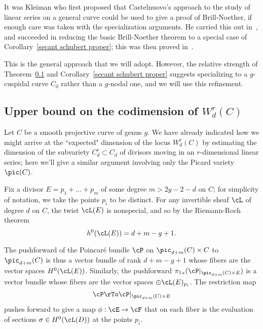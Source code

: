 
It was Kleiman who first proposed that Castelnuovo's approach to the study of linear series on a general curve could be used to give a proof of Brill-Noether, if enough care was taken with the specialization arguments. He carried this out in~\cite{Kleiman-special}, and succeeded in reducing the basic Brill-Noether theorem to a special case of Corollary~\ref{secant schubert proper}; this was then proved in~\cite{Griffiths-Harris-BN}.

This is the general approach that we will adopt. However, the relative strength of Theorem~\ref{} and Corollary~\ref{secant schubert proper} suggests specializing to a $g$-cuspidal curve $C_0$ rather than a $g$-nodal one, and we will use
this refinement.

\subsection{Upper bound on the codimension of $W^r_d(C)$}

Let $C$ be a smooth projective curve of genus $g$. We have already indicated how we might arrive at the ``expected" dimension of the locus $W^r_d(C)$ by estimating the dimension of the subvariety $C^r_d \subset C_d$ of divisors moving in an $r$-dimensional linear series; here we'll give a similar argument involving only the Picard variety $\pic(C)$.

Fix a divisor $E = p_1 + \dots + p_m$ of some degree $m > 2g-2-d$ on $C$; for simplicity of notation, we take the points $p_i$ to be distinct. For any invertible sheaf $\cL$ of degree $d$ on $C$, the twist $\cL(E)$ is nonspecial, and so by the Riemann-Roch theorem 
$$
h^0(\cL(E)) = d + m - g + 1.
$$

The pushforward of the Poincar\'e bundle $\cP$ on $\pic_{d+m}(C) \times C$ to $\pic_{d+m}(C)$ is thus a vector
bundle of rank $d + m - g + 1$ whose fibers are the vector spaces $H^0(\cL(E))$. Similarly,
the pushforward ${\pi_1}_*(\cP|_{\pic_{d+m}(C) \times E})$
is a vector bundle whose fibers are the vector spaces $\oplus \cL(E)_{p_i}$. The restriction map
$$
\cP  \rTo \cP|_{\pic_{d+m}(C) \times E}
$$
pushes forward to give a map $\phi : \cE \to \cF$ that on each fiber is the evaluation of sections $\sigma \in H^0(\cL(D))$ at the points $p_i$.

